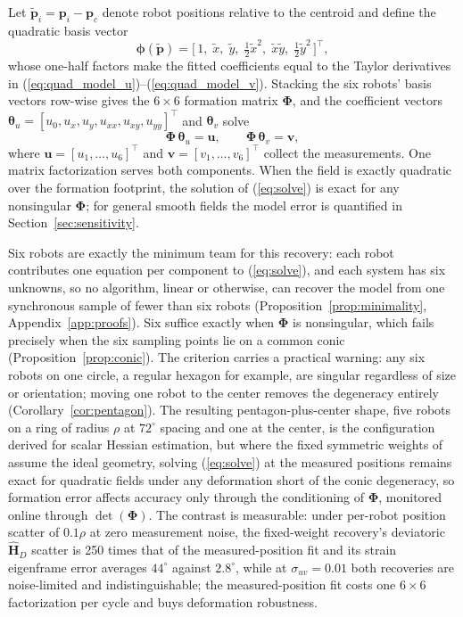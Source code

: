 \documentclass[lettersize,journal]{IEEEtran}
\begin{document}
Let $\tilde{\mathbf{p}}_i = \mathbf{p}_i - \mathbf{p}_c$ denote robot
positions relative to the centroid and define the quadratic basis vector
\begin{equation}
    \boldsymbol{\phi}(\tilde{\mathbf{p}}) =
    \bigl[\,1, \; \tilde{x}, \; \tilde{y}, \; \tfrac{1}{2}\tilde{x}^2, \;
    \tilde{x}\tilde{y}, \; \tfrac{1}{2}\tilde{y}^2\,\bigr]^\top,
    \label{eq:basis}
\end{equation}
whose one-half factors make the fitted coefficients equal to the Taylor
derivatives in (\ref{eq:quad_model_u})--(\ref{eq:quad_model_v}).
Stacking the six robots' basis vectors row-wise gives the $6 \times 6$
formation matrix $\boldsymbol{\Phi}$, and the coefficient vectors
$\boldsymbol{\theta}_u = [u_0, u_x, u_y, u_{xx}, u_{xy}, u_{yy}]^\top$
and $\boldsymbol{\theta}_v$ solve
\begin{equation}
    \boldsymbol{\Phi}\,\boldsymbol{\theta}_u = \mathbf{u}, \qquad
    \boldsymbol{\Phi}\,\boldsymbol{\theta}_v = \mathbf{v},
    \label{eq:solve}
\end{equation}
where $\mathbf{u} = [u_1, \ldots, u_6]^\top$ and $\mathbf{v} = [v_1,
\ldots, v_6]^\top$ collect the measurements. One matrix factorization
serves both components. When the field is exactly quadratic over the
formation footprint, the solution of (\ref{eq:solve}) is exact for any
nonsingular $\boldsymbol{\Phi}$; for general smooth fields the model
error is quantified in Section~\ref{sec:sensitivity}.

Six robots are exactly the minimum team for this recovery: each robot
contributes one equation per component to (\ref{eq:solve}), and each
system has six unknowns, so no algorithm, linear or otherwise, can
recover the model from one synchronous sample of fewer than six robots
(Proposition~\ref{prop:minimality}, Appendix~\ref{app:proofs}). Six
suffice exactly when $\boldsymbol{\Phi}$ is nonsingular, which fails
precisely when the six sampling points lie on a common conic
(Proposition~\ref{prop:conic}). The criterion carries a practical
warning: any six robots on one circle, a regular hexagon for example,
are singular regardless of size or orientation; moving one robot to the
center removes the degeneracy entirely (Corollary~\ref{cor:pentagon}).
The resulting pentagon-plus-center shape, five robots on a ring of
radius $\rho$ at $72^\circ$ spacing and one at the center, is the
configuration \cite{15} derived for scalar Hessian estimation, but
where the fixed symmetric weights of \cite{15} assume the ideal
geometry, solving (\ref{eq:solve}) at the measured positions remains
exact for quadratic fields under any deformation short of the conic
degeneracy, so formation error affects accuracy only through the
conditioning of $\boldsymbol{\Phi}$, monitored online through
$\det(\boldsymbol{\Phi})$. The contrast is measurable: under per-robot
position scatter of $0.1\rho$ at zero measurement noise, the
fixed-weight recovery's deviatoric $\hat{\mathbf{H}}_D$ scatter is 250
times that of the measured-position fit and its strain eigenframe
error averages $44^\circ$ against $2.8^\circ$, while at
$\sigma_{uv} = 0.01$ both recoveries are noise-limited and
indistinguishable; the measured-position fit costs one $6 \times 6$
factorization per cycle and buys deformation robustness.
\end{document}

